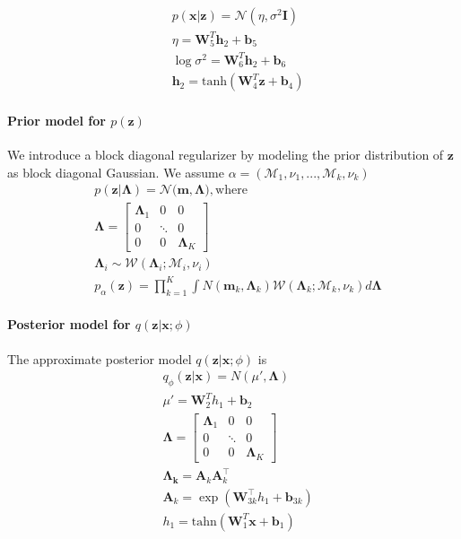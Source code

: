\begin{align}
& p(\mathbf{x}|\mathbf{z}) = \mathcal{N}(\eta, \sigma^2\mathbf{I}) \\
& \eta = \mathbf{W}_5^T\mathbf{h}_2 + \mathbf{b}_5 \\
& \log \sigma^2 = \mathbf{W}_6^T\mathbf{h}_2 + \mathbf{b}_6 \\
& \mathbf{h}_2 = \mbox{tanh}(\mathbf{W}_4^T\mathbf{z} + \mathbf{b}_4)
\end{align}


\paragraph{Prior model for $p(\mathbf{z})$}
We introduce a block diagonal regularizer by modeling the prior distribution of $\mathbf{z}$ as block diagonal Gaussian. We assume $\alpha=(\mathcal{M}_{1}, \nu_{1},...,\mathcal{M}_{k},\nu_{k})$
\begin{align}
& p(\mathbf{z}| \mathbf{\Lambda}) = \mathcal{N}(\mathbf{m},\mathbf{\Lambda)}, \mbox{where} \nonumber\\
& \mathbf{\Lambda} = \begin{bmatrix}
\mathbf{\Lambda}_1 & 0 & 0 \\
0 & \ddots & 0  \\
0 & 0 & \mathbf{\Lambda}_{K}
\end{bmatrix} \\
& \mathbf{\Lambda}_{i} \sim \mathcal{W}(\mathbf{\Lambda}_{i}; \mathcal{M}_{i}, \nu_{i})\\
& p_{\alpha}(\mathbf{z}) = \prod_{k=1}^{K}  \int N(\mathbf{m}_k, \mathbf{\Lambda}_k) \mathcal{W}(\mathbf{\Lambda}_{k}; \mathcal{M}_{k}, \nu_{k}) d\mathbf{\Lambda}
\end{align}

\paragraph{Posterior model for $q(\mathbf{z}|\mathbf{x};\phi)$}
The approximate posterior model $q(\mathbf{z}|\mathbf{x};\phi)$ is
\begin{align}
& q_{\phi}(\mathbf{z}|\mathbf{x})=N(\mu', \mathbf{\Lambda}) \\
& \mu' = \mathbf{W}_2^T h_1 + \mathbf{b}_2 \\
&\mathbf{\Lambda} = \begin{bmatrix}
\mathbf{\Lambda}_1 & 0 & 0 \\
0 & \ddots & 0  \\
0 & 0 & \mathbf{\Lambda}_{K}
\end{bmatrix} \\
& \mathbf{\Lambda_k} = \mathbf{A}_k\mathbf{A}_k^{\top}\\
& \mathbf{A}_k= \exp(\mathbf{W}_{3k}^{\top}h_1 + \mathbf{b}_{3k})\\
& h_1 = \mbox{tahn}(\mathbf{W}_1^T\mathbf{x} + \mathbf{b}_1)
\end{align}


